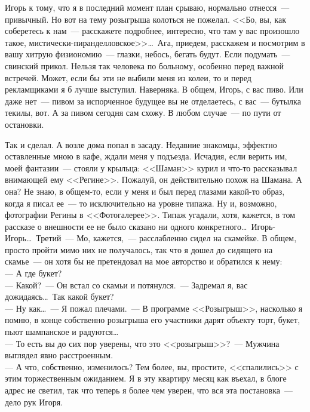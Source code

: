 Игорь к тому, что я в последний момент план срываю, нормально отнесся~--- 
привычный. Но вот на тему розыгрыша колоться не пожелал. <<Бо, вы, как 
соберетесь к нам~--- расскажете подробнее, интересно, что там у вас произошло такое, 
мистически-пиранделловское>>\ldots\ Ага, приедем, расскажем и посмотрим в вашу 
хитрую физиономию~--- глазки, небось, бегать будут. Если подумать~--- свинский прикол. 
Нельзя так человека по больному, особенно перед важной встречей. Может, если бы 
эти не выбили меня из колеи, то и перед рекламщиками я б лучше выступил. 
Наверняка. В общем, Игорь, с вас пиво. Или даже нет~--- пивом за испорченное 
будущее вы не отделаетесь, с вас~--- бутылка текилы, вот. А за пивом сегодня 
сам схожу. В любом случае~--- по пути от остановки.

Так и сделал. А возле дома попал в засаду. Недавние знакомцы, эффектно 
оставленные мною в кафе, ждали меня у подъезда. Исчадия, если верить им, моей 
фантазии~--- стояли у крыльца: <<Шаман>> курил и что-то рассказывал внимающей 
ему <<Регине>>. Пожалуй, он действительно похож на Шамана. А она? Не знаю, в 
общем-то, если у меня и был перед глазами какой-то образ, когда я писал ее~--- то 
исключительно на уровне типажа. Ну и, возможно, фотографии Регины в 
<<Фотогалерее>>. Типаж угадали, хотя, кажется, в том рассказе о внешности ее не 
было сказано ни одного конкретного\ldots\ Игорь-Игорь\ldots\ Третий~--- Мо, 
кажется,~--- расслабленно сидел на скамейке. В общем, просто пройти мимо них не получалось, 
так что я дошел до сидящего на скамье~--- он хотя бы не претендовал на мое 
авторство и обратился к нему:\\
--- А где букет?\\
--- Какой?~--- Он встал со скамьи и потянулся.~--- Задремал я, вас 
дожидаясь\ldots\ Так какой букет?\\
--- Ну как\ldots~--- Я пожал плечами.~--- В программе <<Розыгрыш>>, насколько я 
помню, в конце собственно розыгрыша его участники дарят объекту торт, букет, пьют 
шампанское и радуются\ldots\\
--- То есть вы до сих пор уверены, что это <<розыгрыш>>?~--- Мужчина выглядел 
явно расстроенным. \\
--- А что, собственно, изменилось? Тем более, вы, простите, <<спалились>> с этим 
торжественным ожиданием. Я в эту квартиру месяц как въехал, в блоге адрес не 
светил, так что теперь я более чем уверен, что вся эта постановка~--- дело рук 
Игоря.

